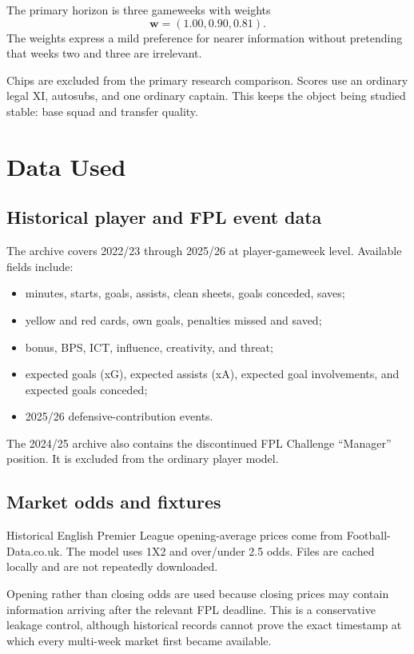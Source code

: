 \documentclass[11pt,a4paper]{article}
\begin{document}
The primary horizon is three gameweeks with weights
\begin{equation}
  \mathbf{w}=(1.00,0.90,0.81).
\end{equation}
The weights express a mild preference for nearer information without pretending that weeks two and three are irrelevant.

Chips are excluded from the primary research comparison. Scores use an ordinary legal XI, autosubs, and one ordinary captain. This keeps the object being studied stable: base squad and transfer quality.

\section{Data Used}

\subsection{Historical player and FPL event data}

The archive covers 2022/23 through 2025/26 at player-gameweek level. Available fields include:

\begin{itemize}
  \item minutes, starts, goals, assists, clean sheets, goals conceded, saves;
  \item yellow and red cards, own goals, penalties missed and saved;
  \item bonus, BPS, ICT, influence, creativity, and threat;
  \item expected goals (xG), expected assists (xA), expected goal involvements, and expected goals conceded;
  \item 2025/26 defensive-contribution events.
\end{itemize}

The 2024/25 archive also contains the discontinued FPL Challenge ``Manager'' position. It is excluded from the ordinary player model.

\subsection{Market odds and fixtures}

Historical English Premier League opening-average prices come from Football-Data.co.uk. The model uses 1X2 and over/under 2.5 odds. Files are cached locally and are not repeatedly downloaded.

Opening rather than closing odds are used because closing prices may contain information arriving after the relevant FPL deadline. This is a conservative leakage control, although historical records cannot prove the exact timestamp at which every multi-week market first became available.
\end{document}
